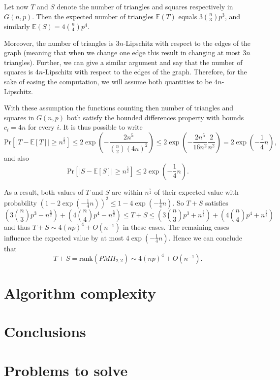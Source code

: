 \documentclass{article}
\newcommand{\E}{\mathbb{E}}
\newcommand{\Prob}{\mathrm{Pr}}
\newcommand{\rank}{\mathrm{rank}}
\begin{document}
	Let now $T$ and $S$ denote the number of triangles and squares respectively in $G(n,p)$.
	Then the expected number of triangles $\E(T)$ equals $3 \binom{n}{3}p^3$, and similarly $\E(S)=4 \binom{n}{4}p^4$.
	
	Moreover, the number of triangles is $3n$-Lipschitz with respect to the edges of the graph (meaning that when we change one edge this result in changing at most $3n$ triangles).
	Further, we can give a similar argument and say that the number of squares is $4n$-Lipschitz with respect to the edges of the graph.
	Therefore, for the sake of easing the computation, we will assume both quantities to be $4n$-Lipschitz.  
	
	With these assumption the functions counting then number of triangles and squares in $G(n,p)$ both satisfy the bounded differences property with bounds $c_i = 4n$ for every $i$.
	It is thus possible to write
	\[
	\Prob[\left|T - \E[T]\right|\geq n^{\frac{5}{2}}] \leq  2 \exp \left(-\frac{2n^5}{\binom{n}{2}(4n)^2} \right) \leq 2 \exp \left(-\frac{2n^5}{16 n^2} \frac{2}{n^2} \right) = 2 \exp \left(-\frac{1}{4}n \right),
	\]
	and also
	\[
	\Prob[\left|S - \E[S]\right|\geq n^{\frac{5}{2}}] \leq  2 \exp \left(-\frac{1}{4}n \right).
	\]
	
	As a result, both values of $T$ and $S$ are within $n^{\frac{5}{2}}$ of their expected value with probability $\left(1- 2\exp \left(-\frac{1}{4}n \right) \right)^2 \leq 1-4\exp\left(-\frac{1}{4}n\right)$.
	So $T+S$ satisfies 
	\[
	\left(3 \binom{n}{3}p^3 - n^{\frac{5}{2}}\right) + \left(4 \binom{n}{4}p^4 - n^{\frac{5}{2}}\right)
	\leq T+S \leq
	\left(3 \binom{n}{3}p^3 + n^{\frac{5}{2}}\right) + \left(4 \binom{n}{4}p^4 + n^{\frac{5}{2}}\right)
	\]
	and thus $T+S \sim 4(np)^4 + O(n^{-1})$ in these cases.
	The remaining cases influence the expected value by at most $4\exp\left(-\frac{1}{4}n\right)$. 
	Hence we can conclude that
	\[
	T+S = \rank(PMH_{2,2}) \sim 4(np)^4 + O(n^{-1}).
	\]
	
	
	\section{Algorithm complexity}
	
	\section{Conclusions}
	
	
	
	
	\section{Problems to solve}
	
\end{document}
